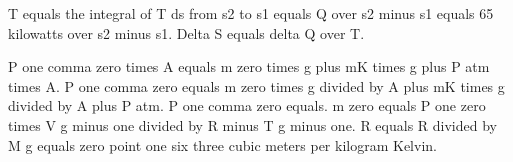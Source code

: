T equals the integral of T ds from s2 to s1 equals Q over s2 minus s1 equals 65 kilowatts over s2 minus s1.
Delta S equals delta Q over T.

P one comma zero times A equals m zero times g plus mK times g plus P atm times A. P one comma zero equals m zero times g divided by A plus mK times g divided by A plus P atm. P one comma zero equals. m zero equals P one zero times V g minus one divided by R minus T g minus one. R equals R divided by M g equals zero point one six three cubic meters per kilogram Kelvin.